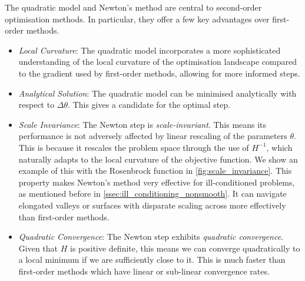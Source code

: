 The quadratic model and Newton's method are central to second-order optimisation methods. In particular, they offer a few key advantages over first-order methods. 
\begin{itemize}
    \item \textit{Local Curvature}: The quadratic model incorporates a more sophisticated understanding of the local curvature of the optimisation landscape compared to the gradient used by first-order methods, allowing for more informed steps.
    \item \textit{Analytical Solution}: The quadratic model can be minimised analytically with respect to $\Delta \theta$. This gives a candidate for the optimal step. 
    \item \textit{Scale Invariance}: The Newton step is \textit{scale-invariant}. This means its performance is not adversely affected by linear rescaling of the parameters $\theta$. This is because it rescales the problem space through the use of $H^{-1}$, which naturally adapts to the local curvature of the objective function. We show an example of this with the Rosenbrock function in \cref{fig:scale_invariance}.
    This property makes Newton's method very effective for ill-conditioned problems, as mentioned before in \cref{ssec:ill_conditioning_nonsmooth}. It can navigate elongated valleys or surfaces with disparate scaling across more effectively than first-order methods.
    \item \textit{Quadratic Convergence}: The Newton step exhibits \textit{quadratic convergence}. Given that $H$ is positive definite, this means we can converge quadratically to a local minimum if we are sufficiently close to it. This is much faster than first-order methods which have linear or sub-linear convergence rates.
\end{itemize}

